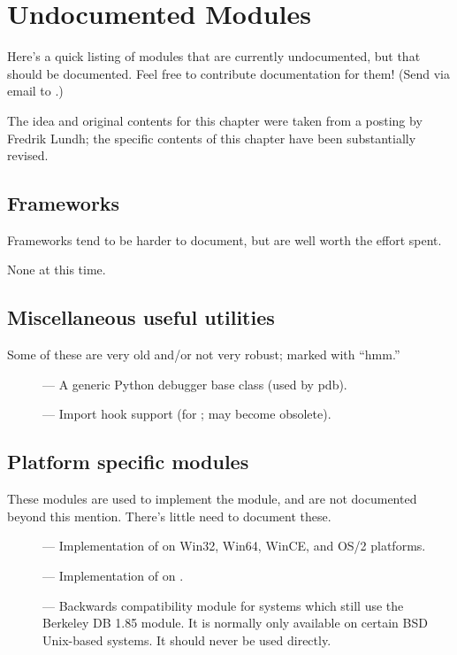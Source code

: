 \chapter{Undocumented Modules \label{undoc}}

Here's a quick listing of modules that are currently undocumented, but
that should be documented.  Feel free to contribute documentation for
them!  (Send via email to .)

The idea and original contents for this chapter were taken
from a posting by Fredrik Lundh; the specific contents of this chapter
have been substantially revised.


\section{Frameworks}

Frameworks tend to be harder to document, but are well worth the
effort spent.

\begin{description}
\item None at this time.
\end{description}


\section{Miscellaneous useful utilities}

Some of these are very old and/or not very robust; marked with ``hmm.''

\begin{description}
\item[]
--- A generic Python debugger base class (used by pdb).

\item[]
--- Import hook support (for ; may become obsolete).
\end{description}



\section{Platform specific modules}

These modules are used to implement the  module,
and are not documented beyond this mention.  There's little need to
document these.

\begin{description}
\item[]
--- Implementation of  on Win32, Win64, WinCE, and
OS/2 platforms.

\item[]
--- Implementation of  on \POSIX.

\item[]
--- Backwards compatibility module for systems which still use the Berkeley
DB 1.85 module.  It is normally only available on certain BSD Unix-based
systems.  It should never be used directly.
\end{description}


